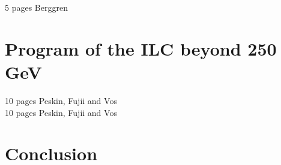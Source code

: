 \documentclass[%
 reprint,
nofootinbib,
 amsmath,amssymb,
 aps,
]{revtex4-1}
\begin{document}
  5 pages Berggren
  
 

\section{\label{sec:ILC-HE}Program of the ILC beyond 250 GeV }
  10 pages Peskin, Fujii and Vos \\
  

  10 pages Peskin, Fujii and Vos
\section{\label{sec:conclusion}Conclusion}




%

\end{document}
